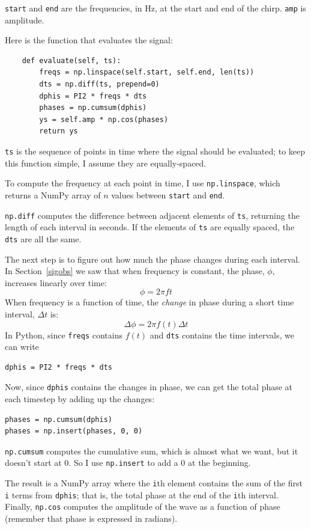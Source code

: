 \documentclass[12pt]{book}
\begin{document}
{\tt start} and {\tt end} are the frequencies, in Hz, at the start
and end of the chirp.  {\tt amp} is amplitude.

Here is the function that evaluates the signal:

\begin{verbatim}
    def evaluate(self, ts):
        freqs = np.linspace(self.start, self.end, len(ts))
        dts = np.diff(ts, prepend=0)
        dphis = PI2 * freqs * dts
        phases = np.cumsum(dphis)
        ys = self.amp * np.cos(phases)
        return ys
\end{verbatim}

{\tt ts} is the sequence of points in time where the signal should be
evaluated; to keep this function simple, I assume they are equally-spaced.

To compute the frequency at each point in time, I use {\tt np.linspace}, which returns a NumPy array of $n$ values between {\tt start} and {\tt end}.

{\tt np.diff} computes the difference between adjacent elements
of {\tt ts}, returning the length of each interval in seconds.
If the elements of {\tt ts} are equally spaced,
the {\tt dts} are all the same.

The next step is to figure out how much the phase changes during
each interval.  In Section~\ref{sigobs} we saw that when frequency is
constant, the phase, $\phi$, increases linearly over time:
%
\[ \phi = 2 \pi f t \]
%
When frequency is a function of time, the {\em change} in phase
during a short time interval, $\Delta t$ is:
%
\[ \Delta \phi = 2 \pi f(t) \Delta t \]
%
In Python, since {\tt freqs} contains $f(t)$ and {\tt dts}
contains the time intervals, we can write

\begin{verbatim}
dphis = PI2 * freqs * dts
\end{verbatim}

Now, since {\tt dphis} contains the changes in phase, we can
get the total phase at each timestep by adding up the changes:

\begin{verbatim}
phases = np.cumsum(dphis)
phases = np.insert(phases, 0, 0)
\end{verbatim}

{\tt np.cumsum} computes the cumulative sum, which is almost
what we want, but it doesn't start at 0.  So I use {\tt np.insert}
to add a 0 at the beginning.

The result is a NumPy array where the {\tt i}th element contains the
sum of the first {\tt i} terms from {\tt dphis}; that is, the total
phase at the end of the {\tt i}th interval.  Finally, {\tt np.cos}
computes the amplitude of the wave as a function of phase (remember
that phase is expressed in radians).
\end{document}
